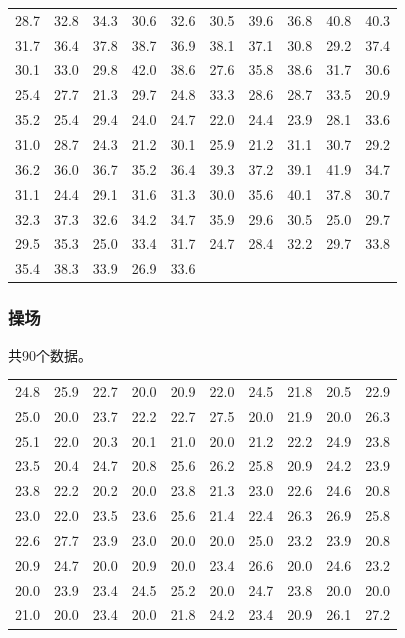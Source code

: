 \documentclass{../ElectromagneticFieldTemplate}
\begin{document}
\begin{longtable}[c]{*{10}{c}}
28.7 & 32.8 & 34.3 & 30.6 & 32.6 & 30.5 & 39.6 & 36.8 & 40.8 & 40.3 \\
31.7 & 36.4 & 37.8 & 38.7 & 36.9 & 38.1 & 37.1 & 30.8 & 29.2 & 37.4 \\
30.1 & 33.0 & 29.8 & 42.0 & 38.6 & 27.6 & 35.8 & 38.6 & 31.7 & 30.6 \\
25.4 & 27.7 & 21.3 & 29.7 & 24.8 & 33.3 & 28.6 & 28.7 & 33.5 & 20.9 \\
35.2 & 25.4 & 29.4 & 24.0 & 24.7 & 22.0 & 24.4 & 23.9 & 28.1 & 33.6 \\
31.0 & 28.7 & 24.3 & 21.2 & 30.1 & 25.9 & 21.2 & 31.1 & 30.7 & 29.2 \\
36.2 & 36.0 & 36.7 & 35.2 & 36.4 & 39.3 & 37.2 & 39.1 & 41.9 & 34.7 \\
31.1 & 24.4 & 29.1 & 31.6 & 31.3 & 30.0 & 35.6 & 40.1 & 37.8 & 30.7 \\
32.3 & 37.3 & 32.6 & 34.2 & 34.7 & 35.9 & 29.6 & 30.5 & 25.0 & 29.7 \\
29.5 & 35.3 & 25.0 & 33.4 & 31.7 & 24.7 & 28.4 & 32.2 & 29.7 & 33.8 \\
35.4 & 38.3 & 33.9 & 26.9 & 33.6 & & & & & \\
\end{longtable}

\subsubsection{操场}
共90个数据。

\begin{longtable}[c]{*{10}{c}}
24.8 & 25.9 & 22.7 & 20.0 & 20.9 & 22.0 & 24.5 & 21.8 & 20.5 & 22.9 \\
25.0 & 20.0 & 23.7 & 22.2 & 22.7 & 27.5 & 20.0 & 21.9 & 20.0 & 26.3 \\
25.1 & 22.0 & 20.3 & 20.1 & 21.0 & 20.0 & 21.2 & 22.2 & 24.9 & 23.8 \\
23.5 & 20.4 & 24.7 & 20.8 & 25.6 & 26.2 & 25.8 & 20.9 & 24.2 & 23.9 \\
23.8 & 22.2 & 20.2 & 20.0 & 23.8 & 21.3 & 23.0 & 22.6 & 24.6 & 20.8 \\
23.0 & 22.0 & 23.5 & 23.6 & 25.6 & 21.4 & 22.4 & 26.3 & 26.9 & 25.8 \\
22.6 & 27.7 & 23.9 & 23.0 & 20.0 & 20.0 & 25.0 & 23.2 & 23.9 & 20.8 \\
20.9 & 24.7 & 20.0 & 20.9 & 20.0 & 23.4 & 26.6 & 20.0 & 24.6 & 23.2 \\
20.0 & 23.9 & 23.4 & 24.5 & 25.2 & 20.0 & 24.7 & 23.8 & 20.0 & 20.0 \\
21.0 & 20.0 & 23.4 & 20.0 & 21.8 & 24.2 & 23.4 & 20.9 & 26.1 & 27.2 \\
\end{longtable}
\end{document}
